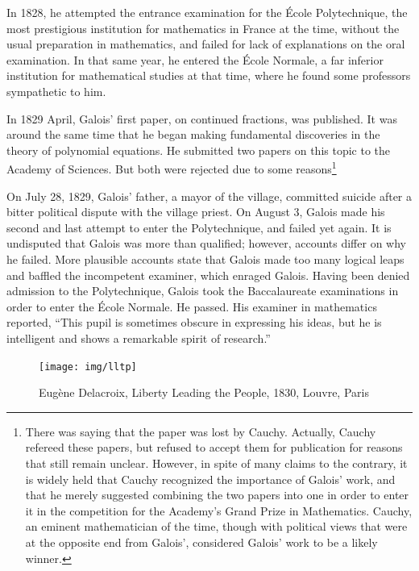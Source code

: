 \documentclass[b5paper]{article}
\begin{document}
In 1828, he attempted the entrance examination for the École Polytechnique, the most prestigious institution for mathematics in France at the time, without the usual preparation in mathematics, and failed for lack of explanations on the oral examination. In that same year, he entered the École Normale, a far inferior institution for mathematical studies at that time, where he found some professors sympathetic to him.

In 1829 April, Galois' first paper, on continued fractions, was published. It was around the same time that he began making fundamental discoveries in the theory of polynomial equations. He submitted two papers on this topic to the Academy of Sciences. But both were rejected due to some reasons\footnote{There was saying that the paper was lost by Cauchy. Actually, Cauchy refereed these papers, but refused to accept them for publication for reasons that still remain unclear. However, in spite of many claims to the contrary, it is widely held that Cauchy recognized the importance of Galois' work, and that he merely suggested combining the two papers into one in order to enter it in the competition for the Academy's Grand Prize in Mathematics. Cauchy, an eminent mathematician of the time, though with political views that were at the opposite end from Galois', considered Galois' work to be a likely winner\cite{Wiki-Galois}.}

On July 28, 1829, Galois' father, a mayor of the village, committed suicide after a bitter political dispute with the village priest\cite{Wiki-Galois}. On August 3, Galois made his second and last attempt to enter the Polytechnique, and failed yet again. It is undisputed that Galois was more than qualified; however, accounts differ on why he failed. More plausible accounts state that Galois made too many logical leaps and baffled the incompetent examiner, which enraged Galois. Having been denied admission to the Polytechnique, Galois took the Baccalaureate examinations in order to enter the École Normale. He passed. His examiner in mathematics reported, ``This pupil is sometimes obscure in expressing his ideas, but he is intelligent and shows a remarkable spirit of research.''

\begin{figure}[htbp]
 \centering
 \texttt{[image: img/lltp]}
 \captionsetup{labelformat=empty}
 \caption{Eugène Delacroix, Liberty Leading the People, 1830, Louvre, Paris}
 \label{fig:Liberty-Leading-the-People}
\end{figure}
\end{document}
